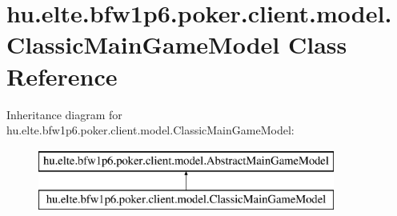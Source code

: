 \hypertarget{classhu_1_1elte_1_1bfw1p6_1_1poker_1_1client_1_1model_1_1_classic_main_game_model}{}\section{hu.\+elte.\+bfw1p6.\+poker.\+client.\+model.\+Classic\+Main\+Game\+Model Class Reference}
\label{classhu_1_1elte_1_1bfw1p6_1_1poker_1_1client_1_1model_1_1_classic_main_game_model}
Inheritance diagram for hu.\+elte.\+bfw1p6.\+poker.\+client.\+model.\+Classic\+Main\+Game\+Model\+:\begin{figure}[H]
\begin{center}
\leavevmode
\includegraphics[height=2.000000cm]{classhu_1_1elte_1_1bfw1p6_1_1poker_1_1client_1_1model_1_1_classic_main_game_model}
\end{center}
\end{figure}
